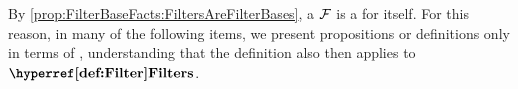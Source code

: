 \begin{rmk}
\rm
    By \ref{prop:FilterBaseFacts:FiltersAreFilterBases}, 
    a \Filter $\mathcal{F}$ is a \FilterBase for itself. 
    For this reason, in many of the following items, 
    we present propositions or definitions only in terms of 
    \FilterBases, understanding that the definition also then applies to 
    $\Filters$. 
\end{rmk}
